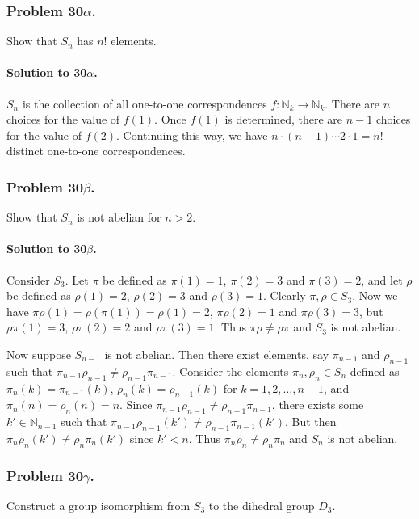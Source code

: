 \subsubsection{Problem 30$\alpha$.}
Show that $S_n$ has $n!$ elements.

\paragraph*{Solution to 30$\alpha$.}
$S_n$ is the collection of all one-to-one correspondences
$f:\mathbb{N}_k \rightarrow \mathbb{N}_k$. There are $n$ choices for the value
of $f(1)$. Once $f(1)$ is determined, there are $n-1$ choices for the value of
$f(2)$. Continuing this way, we have $n \cdot (n-1) \cdots 2 \cdot 1 = n!$ distinct
one-to-one correspondences.

\subsubsection{Problem 30$\beta$.}
Show that $S_n$ is not abelian for $n > 2$.

\paragraph*{Solution to 30$\beta$.}
Consider $S_3$. Let $\pi$ be defined as $\pi(1) = 1$, $\pi(2) = 3$ and $\pi(3) = 2$,
and let $\rho$ be defined as $\rho(1) = 2$, $\rho(2) = 3$ and $\rho(3) = 1$. Clearly
$\pi, \rho \in S_3$. Now we have $\pi \rho (1) = \rho (\pi (1)) = \rho (1) = 2$,
$\pi \rho (2) = 1$ and $\pi \rho (3) = 3$, but $\rho \pi (1) = 3$, $\rho \pi (2) = 2$
and $\rho \pi (3) = 1$. Thus $\pi \rho \neq \rho \pi$ and $S_3$ is not abelian.

Now suppose $S_{n-1}$ is not abelian. Then there exist elements, say $\pi_{n-1}$
and $\rho_{n-1}$ such that $\pi_{n-1} \rho_{n-1} \neq \rho_{n-1} \pi_{n-1}$.
Consider the elements $\pi_n, \rho_n \in S_n$ defined as $\pi_n(k) = \pi_{n-1}(k)$,
$\rho_n(k) = \rho_{n-1}(k)$ for $k = 1, 2, \dots, n-1$, and $\pi_n(n) = \rho_n(n) = n$.
Since $\pi_{n-1} \rho_{n-1} \neq \rho_{n-1} \pi_{n-1}$, there exists some
$k' \in \mathbb{N}_{n-1}$ such that $\pi_{n-1} \rho_{n-1} (k') \neq \rho_{n-1} \pi_{n-1} (k')$.
But then $\pi_n \rho_n (k') \neq \rho_n \pi_n (k')$ since $k' < n$. Thus
$\pi_n \rho_n \neq \rho_n \pi_n$ and $S_n$ is not abelian.

\subsubsection{Problem 30$\gamma$.}
Construct a group isomorphism from $S_3$ to the dihedral group $D_3$.

